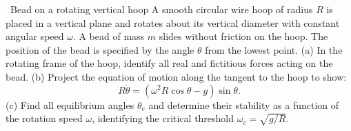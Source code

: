 \begin{exercise}{\mastery\ Bead on a rotating vertical hoop}
A smooth circular wire hoop of radius $R$ is placed in a vertical plane and rotates about its vertical diameter with constant angular speed $\omega$. A bead of mass $m$ slides without friction on the hoop. The position of the bead is specified by the angle $\theta$ from the lowest point.
(a) In the rotating frame of the hoop, identify all real and fictitious forces acting on the bead.
(b) Project the equation of motion along the tangent to the hoop to show:
\[
R\ddot{\theta} = \left(\omega^2 R\cos\theta - g\right)\sin\theta.
\]
(c) Find all equilibrium angles $\theta_e$ and determine their stability as a function of the rotation speed $\omega$, identifying the critical threshold $\omega_c = \sqrt{g/R}$.
\end{exercise}

\begin{tabletworkspace}[6.5cm]
\end{tabletworkspace}


